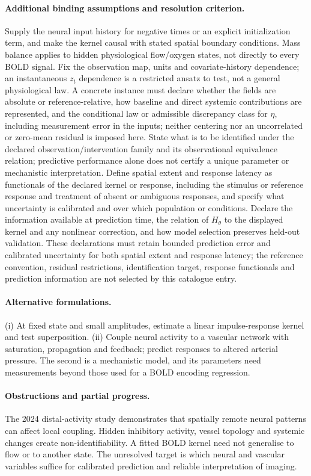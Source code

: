 \documentclass[11pt]{article}
\begin{document}
\paragraph{Additional binding assumptions and resolution criterion.} Supply the neural input history for negative times or an explicit initialization term, and make the kernel causal with stated spatial boundary conditions. Mass balance applies to hidden physiological flow/oxygen states, not directly to every BOLD signal. Fix the observation map, units and covariate-history dependence; an instantaneous $z_t$ dependence is a restricted ansatz to test, not a general physiological law. A concrete instance must declare whether the fields are absolute or reference-relative, how baseline and direct systemic contributions are represented, and the conditional law or admissible discrepancy class for $\eta$, including measurement error in the inputs; neither centering nor an uncorrelated or zero-mean residual is imposed here. State what is to be identified under the declared observation/intervention family and its observational equivalence relation; predictive performance alone does not certify a unique parameter or mechanistic interpretation. Define spatial extent and response latency as functionals of the declared kernel or response, including the stimulus or reference response and treatment of absent or ambiguous responses, and specify what uncertainty is calibrated and over which population or conditions. Declare the information available at prediction time, the relation of $H_\theta$ to the displayed kernel and any nonlinear correction, and how model selection preserves held-out validation. These declarations must retain bounded prediction error and calibrated uncertainty for both spatial extent and response latency; the reference convention, residual restrictions, identification target, response functionals and prediction information are not selected by this catalogue entry.

\paragraph{Alternative formulations.} (i) At fixed state and small amplitudes, estimate a linear impulse-response kernel and test superposition. (ii) Couple neural activity to a vascular network with saturation, propagation and feedback; predict responses to altered arterial pressure. The second is a mechanistic model, and its parameters need measurements beyond those used for a BOLD encoding regression.
\paragraph{Obstructions and partial progress.} The 2024 distal-activity study demonstrates that spatially remote neural patterns can affect local coupling. Hidden inhibitory activity, vessel topology and systemic changes create non-identifiability. A fitted BOLD kernel need not generalise to flow or to another state. The unresolved target is which neural and vascular variables suffice for calibrated prediction and reliable interpretation of imaging.
\end{document}
